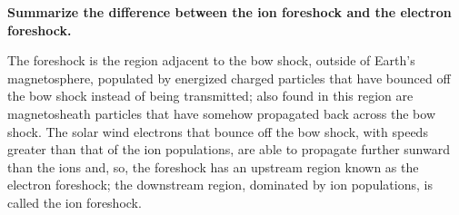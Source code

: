 \textbf{Summarize the difference between the ion foreshock and the
electron foreshock.}

The foreshock is the region adjacent to the bow shock, outside of
Earth's magnetosphere, populated by energized charged particles that
have bounced off the bow shock instead of being transmitted; also found
in this region are magnetosheath particles that have somehow propagated
back across the bow shock.
The solar wind electrons that bounce off the bow shock, with speeds greater than that of the ion
populations, are able to propagate further sunward than the ions and,
so, the foreshock has an upstream region known as the electron
foreshock;  the downstream region, dominated by ion populations, is called the ion foreshock. 

